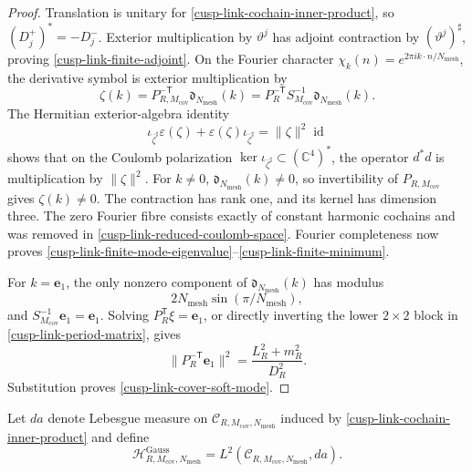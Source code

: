 \begin{proof}
Translation is unitary for \eqref{cusp-link-cochain-inner-product}, so
\((D_j^+)^*=-D_j^-\).  Exterior multiplication by \(\vartheta^j\) has
adjoint contraction by \((\vartheta^j)^\sharp\), proving
\eqref{cusp-link-finite-adjoint}.  On the Fourier character
\(\chi_k(n)=e^{2\pi i k\cdot n/N_{\mathrm{mesh}}}\), the derivative symbol
is exterior multiplication by
\[
 \zeta(k)=P_{R,M_{\mathrm{cov}}}^{-\mathsf T}
           \mathfrak d_{N_{\mathrm{mesh}}}(k)
 =P_R^{-\mathsf T}S_{M_{\mathrm{cov}}}^{-1}
           \mathfrak d_{N_{\mathrm{mesh}}}(k).
\]
The Hermitian exterior-algebra identity
\[
 \iota_{\overline\zeta^\sharp}\varepsilon(\zeta)
 +\varepsilon(\zeta)\iota_{\overline\zeta^\sharp}
 =\lVert\zeta\rVert^2\operatorname{id}
\]
shows that on the Coulomb polarization
\(\ker\iota_{\overline\zeta^\sharp}\subset(\mathbb C^4)^*\), the operator
\(d^*d\) is multiplication by \(\lVert\zeta\rVert^2\).  For \(k\neq0\),
\(\mathfrak d_{N_{\mathrm{mesh}}}(k)\neq0\), so invertibility of
\(P_{R,M_{\mathrm{cov}}}\) gives
\(\zeta(k)\neq0\).  The contraction has rank one, and its kernel has
dimension three.  The zero Fourier fibre consists exactly of constant
harmonic cochains and was removed in
\eqref{cusp-link-reduced-coulomb-space}.  Fourier completeness now proves
\eqref{cusp-link-finite-mode-eigenvalue}--\eqref{cusp-link-finite-minimum}.

For \(k=\mathbf e_1\), the only nonzero component of
\(\mathfrak d_{N_{\mathrm{mesh}}}(k)\) has modulus
\[
 2N_{\mathrm{mesh}}\sin(\pi/N_{\mathrm{mesh}}),
\]
and
\(S_{M_{\mathrm{cov}}}^{-1}\mathbf e_1=\mathbf e_1\).  Solving
\(P_R^{\mathsf T}\xi=\mathbf e_1\), or directly inverting the lower
\(2\times2\) block in \eqref{cusp-link-period-matrix}, gives
\[
 \lVert P_R^{-\mathsf T}\mathbf e_1\rVert^2
 =\frac{L_R^2+m_R^2}{D_R^2}.
\]
Substitution proves \eqref{cusp-link-cover-soft-mode}.
\end{proof}

Let \(da\) denote Lebesgue measure on
\(\mathscr C_{R,M_{\mathrm{cov}},N_{\mathrm{mesh}}}\) induced by
\eqref{cusp-link-cochain-inner-product} and define
\begin{equation}
 \mathcal H^{\mathrm{Gauss}}_{R,M_{\mathrm{cov}},N_{\mathrm{mesh}}}
 =L^2(\mathscr C_{R,M_{\mathrm{cov}},N_{\mathrm{mesh}}},da).
 \label{cusp-link-gaussian-hilbert-space}
\end{equation}

